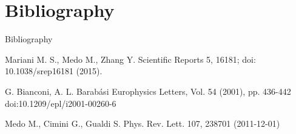 \section*{Bibliography}

\begin{frame}{Bibliography}
    \begin{thebibliography}{4}
            Mariani M. S., Medo M., Zhang Y.
            \newblock Scientific Reports 5, 16181;
            \newblock doi: 10.1038/srep16181 (2015).

            G. Bianconi, A. L. Barabási
            \newblock Europhysics Letters, Vol. 54 (2001), pp. 436-442
            \newblock doi:10.1209/epl/i2001-00260-6

            Medo M., Cimini G., Gualdi S.
            \newblock Phys. Rev. Lett. 107, 238701 (2011-12-01)
    \end{thebibliography}
\end{frame}
